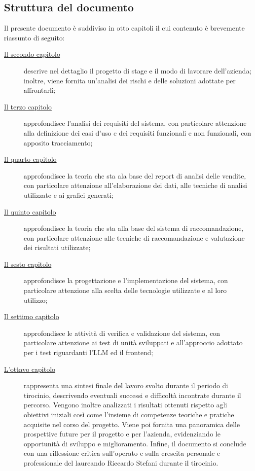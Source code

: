 \subsection{Struttura del documento}
\label{sec:organizzazione-testo}
Il presente documento è suddiviso in otto capitoli il cui contenuto è brevemente riassunto di seguito:

\begin{description}
    \item[{\hyperref[cap:descrizione-stage]{Il secondo capitolo}}] descrive nel dettaglio il progetto di stage e il modo di lavorare dell'azienda; inoltre, viene fornita un'analisi dei rischi e delle soluzioni adottate per affrontarli;
    
    \item[{\hyperref[cap:analisi-requisiti]{Il terzo capitolo}}] approfondisce l'analisi dei requisiti del sistema, con particolare attenzione alla definizione dei casi d'uso e dei requisiti funzionali e non funzionali, con apposito tracciamento;
    
    \item[{\hyperref[cap:report-vendite]{Il quarto capitolo}}] approfondisce la teoria che sta ala base del report di analisi delle vendite, con particolare attenzione all'elaborazione dei dati, alle tecniche di analisi utilizzate e ai grafici generati;
    
    \item[{\hyperref[cap:sistema-raccomandazione]{Il quinto capitolo}}] approfondisce la teoria che sta alla base del sistema di raccomandazione, con particolare attenzione alle tecniche di raccomandazione e valutazione dei risultati utilizzate;
    
    \item[{\hyperref[cap:progettazione-implementazione]{Il sesto capitolo}}] approfondisce la progettazione e l'implementazione del sistema, con particolare attenzione alla scelta delle tecnologie utilizzate e al loro utilizzo;
    
    \item[{\hyperref[cap:verifica-validazione]{Il settimo capitolo}}] approfondisce le attività di verifica e validazione del sistema, con particolare attenzione ai test di unità sviluppati e all'approccio adottato per i test riguardanti l'LLM ed il frontend;
    
    \item[{\hyperref[cap:conclusioni]{L'ottavo capitolo}}] rappresenta una sintesi finale del lavoro svolto durante il periodo di tirocinio, descrivendo eventuali successi e difficoltà incontrate durante il percorso. Vengono inoltre analizzati i risultati ottenuti rispetto agli obiettivi iniziali così come l’insieme di competenze teoriche e pratiche acquisite nel corso del progetto. Viene poi fornita una panoramica delle prospettive future per il progetto e per l'azienda, evidenziando le opportunità di sviluppo e miglioramento. Infine, il documento si conclude con una riflessione critica sull’operato e sulla crescita personale e professionale del laureando Riccardo Stefani durante il tirocinio.

\end{description}

